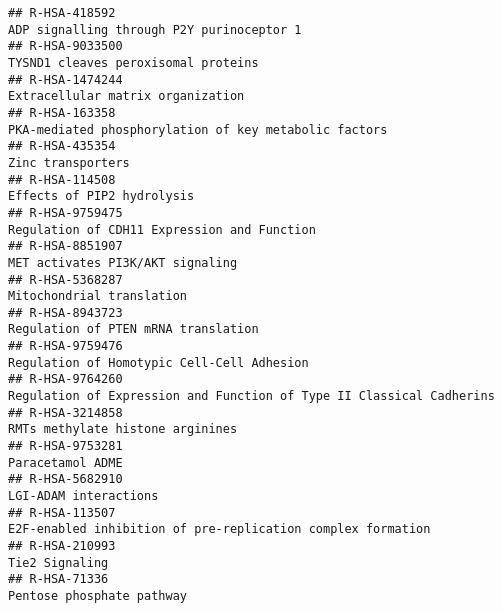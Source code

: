 \documentclass[
]{article}
\begin{document}
\begin{verbatim}
## R-HSA-418592                                                                                             ADP signalling through P2Y purinoceptor 1
## R-HSA-9033500                                                                                                  TYSND1 cleaves peroxisomal proteins
## R-HSA-1474244                                                                                                    Extracellular matrix organization
## R-HSA-163358                                                                                 PKA-mediated phosphorylation of key metabolic factors
## R-HSA-435354                                                                                                                     Zinc transporters
## R-HSA-114508                                                                                                            Effects of PIP2 hydrolysis
## R-HSA-9759475                                                                                          Regulation of CDH11 Expression and Function
## R-HSA-8851907                                                                                                     MET activates PI3K/AKT signaling
## R-HSA-5368287                                                                                                            Mitochondrial translation
## R-HSA-8943723                                                                                                  Regulation of PTEN mRNA translation
## R-HSA-9759476                                                                                           Regulation of Homotypic Cell-Cell Adhesion
## R-HSA-9764260                                                                 Regulation of Expression and Function of Type II Classical Cadherins
## R-HSA-3214858                                                                                                     RMTs methylate histone arginines
## R-HSA-9753281                                                                                                                     Paracetamol ADME
## R-HSA-5682910                                                                                                                LGI-ADAM interactions
## R-HSA-113507                                                                           E2F-enabled inhibition of pre-replication complex formation
## R-HSA-210993                                                                                                                        Tie2 Signaling
## R-HSA-71336                                                                                                              Pentose phosphate pathway

\end{verbatim}
\end{document}
